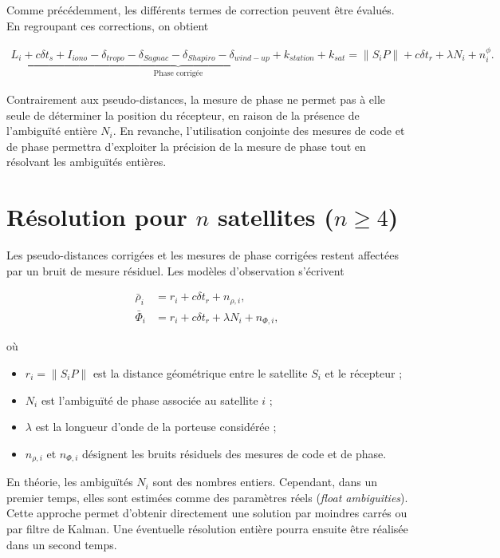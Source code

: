 Comme précédemment, les différents termes de correction peuvent être évalués. En regroupant ces corrections, on obtient

\begin{align}
\underbrace{
L_i
+
c\delta t_s
+
I_{iono}
-
\delta_{tropo}
-
\delta_{Sagnac}
-
\delta_{Shapiro}
-
\delta_{wind-up}
+
k_{station}
+
k_{sat}
}_{\text{Phase corrigée}}
=
\|S_iP\|
+
c\delta t_r
+
\lambda N_i
+
n_i^\phi.
\label{eq:phase_corrigee}
\end{align}

Contrairement aux pseudo-distances, la mesure de phase ne permet pas à elle seule de déterminer la position du récepteur, en raison de la présence de l'ambiguïté entière $N_i$. En revanche, l'utilisation conjointe des mesures de code et de phase permettra d'exploiter la précision de la mesure de phase tout en résolvant les ambiguïtés entières.

\section{\texorpdfstring{Résolution pour $n$ satellites ($n\ge4$)}{Résolution pour n satellites (n>=4)}} \label{resolution}

Les pseudo-distances corrigées et les mesures de phase corrigées restent affectées par un bruit de mesure résiduel. Les modèles d'observation s'écrivent

\begin{align}
\bar{\rho}_i
&=
r_i
+
c\delta t_r
+
n_{\rho,i},
\\
\bar{\Phi}_i
&=
r_i
+
c\delta t_r
+
\lambda N_i
+
n_{\Phi,i},
\label{eq:modeles_obs}
\end{align}

où

\begin{itemize}
\item $r_i=\|S_iP\|$ est la distance géométrique entre le satellite $S_i$ et le récepteur ;
\item $N_i$ est l'ambiguïté de phase associée au satellite $i$ ;
\item $\lambda$ est la longueur d'onde de la porteuse considérée ;
\item $n_{\rho,i}$ et $n_{\Phi,i}$ désignent les bruits résiduels des mesures de code et de phase.
\end{itemize}

En théorie, les ambiguïtés $N_i$ sont des nombres entiers. Cependant, dans un premier temps, elles sont estimées comme des paramètres réels (\emph{float ambiguities}). Cette approche permet d'obtenir directement une solution par moindres carrés ou par filtre de Kalman. Une éventuelle résolution entière pourra ensuite être réalisée dans un second temps.

